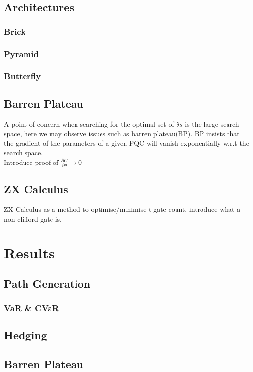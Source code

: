 \documentclass[12pt]{article}
\numberwithin{equation}{section}
\begin{document}
\subsection{Architectures}
\subsubsection{Brick}
\subsubsection{Pyramid}
\subsubsection{Butterfly}

\subsection{Barren Plateau}
A point of concern when searching for the optimal set of $\theta s$ is the large 
search space, here we may observe issues such as barren plateau(BP). BP 
insists that the gradient of the parameters of a given PQC will vanish exponentially 
w.r.t the search space.
\\ 
Introduce proof of $\frac{\partial C}{\partial \theta} \rightarrow 0 $


\subsection{ZX Calculus}
ZX Calculus as a method to optimise/minimise t gate count. introduce what a 
non clifford gate is.



\section{Results}

\subsection{Path Generation}
\subsubsection{VaR \& CVaR}
\subsection{Hedging}

\subsection{Barren Plateau}
\end{document}
